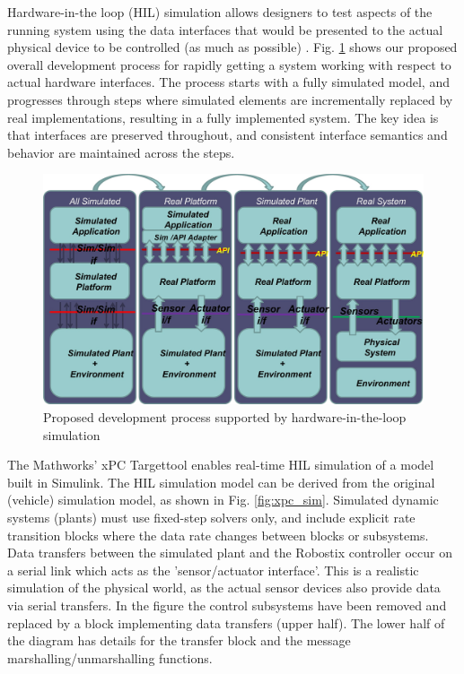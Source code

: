 Hardware-in-the loop (HIL) simulation allows designers to test aspects of the running system using the data interfaces that would be presented to the actual physical device to be controlled (as much as possible) .  Fig. \ref{fig:sim_flow} shows our proposed overall development process for rapidly getting a system working with respect to actual hardware interfaces. The process starts with a fully simulated model, and progresses through steps where simulated elements are incrementally replaced by real implementations, resulting in a fully implemented system. The key idea is that interfaces are preserved throughout, and consistent interface semantics and behavior are maintained across the steps.

\begin{figure}[ht]
\centering
\includegraphics[width=\columnwidth]{figures/sim_flow.jpg}
    \caption{Proposed development process supported by hardware-in-the-loop simulation}
    \label{fig:sim_flow}
\end{figure}

The Mathworks' xPC Target\textregistered tool\cite{mathworks:tools} enables real-time HIL simulation of a model built in Simulink.  The HIL simulation model can be derived from the original (vehicle) simulation model, as shown in Fig. \ref{fig:xpc_sim}. Simulated dynamic systems (plants) must use fixed-step solvers only, and include explicit rate transition blocks where the data rate changes between blocks or subsystems.  Data transfers between the simulated plant and the Robostix controller occur on a serial link which acts as the 'sensor/actuator interface'.  This is a realistic simulation of the physical world, as the actual sensor devices also provide data via serial transfers.  In the figure the control subsystems have been removed and replaced by a block implementing data transfers (upper half). The lower half of the diagram has details for the transfer block and the message marshalling/unmarshalling functions. 

